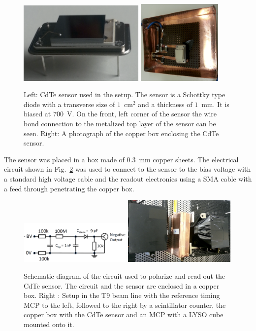 \begin{figure}[htbp] 
\centering
\includegraphics[width=0.55\textwidth]{figures/CdTeSensor.png} 
\includegraphics[width=0.37\textwidth]{figures/CdTeSensorBox.png} 
\caption{Left: CdTe sensor used in the setup. The sensor is a Schottky type diode with a transverse size 
of $1$~$\mathrm{cm}^{2}$ and a thickness of $1$~mm. It is biased at $700$~V. 
On the front, left corner of the sensor the wire bond connection 
to the metalized top layer of the sensor can be seen. Right: A photograph of the copper box
enclosing the CdTe sensor. } 
\label{fig:CdTeSensor} 
\end{figure} 
%
The sensor was placed in a box made of $0.3$~mm copper sheets. 
The electrical circuit shown in Fig.~\ref{fig:cdtecircuit} was used to connect to the sensor to the bias 
voltage with a standard high voltage cable and the readout electronics using a SMA cable with a feed 
through penetrating the copper box.

%
\begin{figure}[htbp] 
\centering
\includegraphics[width=0.49\textwidth]{figures/circuit_CdTe.png} 
\includegraphics[width=0.49\textwidth]{figures/CdTeT9Setup.png} 
\caption{Schematic diagram of the circuit used to polarize and read out the 
CdTe sensor. The circuit and the sensor are enclosed in a copper box. Right : Setup in the T9 beam line with the reference timing MCP to the left, followed to the right by a scintillator counter, the copper box with the CdTe sensor and an MCP with a LYSO cube mounted onto it.} 
\label{fig:cdtecircuit} 
\end{figure} 
%
